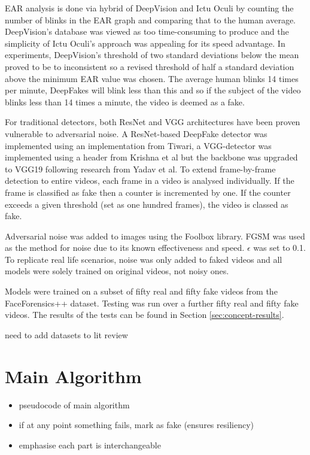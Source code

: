 EAR analysis is done via hybrid of DeepVision\cite{jung2020deepvision} and Ictu Oculi\cite{li2018ictu} by counting the number of blinks in the EAR graph and comparing that to the human average. DeepVision's database was viewed as too time-consuming to produce and the simplicity of Ictu Oculi's approach was appealing for its speed advantage. In experiments, DeepVision's threshold of two standard deviations below the mean proved to be to inconsistent so a revised threshold of half a standard deviation above the minimum EAR value was chosen. The average human blinks 14 times per minute\cite{schiffman1990sensation}, DeepFakes will blink less than this and so if the subject of the video blinks less than 14 times a minute, the video is deemed as a fake.

For traditional detectors, both ResNet and VGG architectures have been proven vulnerable to adversarial noise\cite{gandhi2020adversarial}. A ResNet-based DeepFake detector was implemented using an implementation from Tiwari\cite{tiwari2024deepfake}, a VGG-detector was implemented using a header from Krishna et al\cite{krishna2022deepfake} but the backbone was upgraded to VGG19 following research from Yadav et al\cite{yadav2024deepfake}. To extend frame-by-frame detection to entire videos, each frame in a video is analysed individually. If the frame is classified as fake then a counter is incremented by one. If the counter exceeds a given threshold (set as one hundred frames), the video is classed as fake. 

Adversarial noise was added to images using the Foolbox library\cite{rauber2017foolbox}\cite{rauber2017foolboxnative}. FGSM was used as the method for noise due to its known effectiveness and speed\cite{gandhi2020adversarial}. $\epsilon$ was set to 0.1. To replicate real life scenarios, noise was only added to faked videos and all models were solely trained on original videos, not noisy ones.

Models were trained on a subset of fifty real and fifty fake videos from the FaceForensics++ dataset. Testing was run over a further fifty real and fifty fake videos. The results of the tests can be found in Section \ref{sec:concept-results}.

{\huge need to add datasets to lit review}

\section{Main Algorithm}

\begin{itemize}
    \item pseudocode of main algorithm
    \item if at any point something fails, mark as fake (ensures resiliency)
    \item emphasise each part is interchangeable
\end{itemize}

